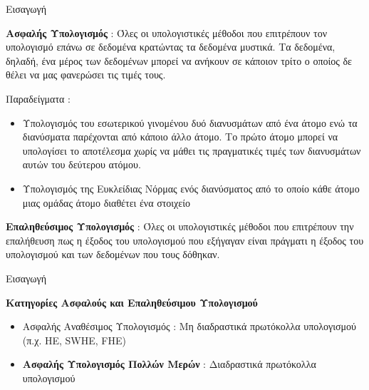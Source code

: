 \documentclass[10pt]{beamer}
\begin{document}
    \begin{frame}{Εισαγωγή}
        \begin{block}{}
            \textbf{Ασφαλής Υπολογισμός} : Όλες οι υπολογιστικές μέθοδοι που επιτρέπουν τον υπολογισμό επάνω σε δεδομένα κρατώντας τα δεδομένα μυστικά. Τα δεδομένα, δηλαδή, ένα μέρος των δεδομένων μπορεί να ανήκουν σε κάποιον τρίτο ο οποίος δε θέλει να μας φανερώσει τις τιμές τους.
        \end{block}{}
        \begin{block}{}
            Παραδείγματα :
            \begin{itemize}
                \item Υπολογισμός του εσωτερικού γινομένου δυό διανυσμάτων από ένα άτομο ενώ τα διανύσματα παρέχονται από κάποιο άλλο άτομο. Το πρώτο άτομο μπορεί να υπολογίσει το αποτέλεσμα χωρίς να μάθει τις πραγματικές τιμές των διανυσμάτων αυτών του δεύτερου ατόμου.
                \item Υπολογισμός της Ευκλείδιας Νόρμας ενός διανύσματος από το οποίο κάθε άτομο μιας ομάδας άτομο διαθέτει ένα στοιχείο
            \end{itemize}
        \end{block}
        \begin{block}{}
            \textbf{Επαληθεύσιμος Υπολογισμός} : Όλες οι υπολογιστικές μέθοδοι που επιτρέπουν την επαλήθευση πως η έξοδος του υπολογισμού που εξήγαγαν είναι πράγματι η έξοδος του υπολογισμού και των δεδομένων που τους δόθηκαν.
        \end{block}{}
    \end{frame}

    \begin{frame}{Εισαγωγή}
        \begin{block}{}
            \textbf{Κατηγορίες Ασφαλούς και Επαληθεύσιμου Υπολογισμού}
            \begin{itemize}
                \item Ασφαλής Αναθέσιμος Υπολογισμός : Μη διαδραστικά πρωτόκολλα υπολογισμού (π.χ. HE, SWHE, FHE)
                \item \textbf{Ασφαλής Υπολογισμός Πολλών Μερών} : Διαδραστικά πρωτόκολλα υπολογισμού
            \end{itemize}
        \end{block}
    \end{frame}
\end{document}

